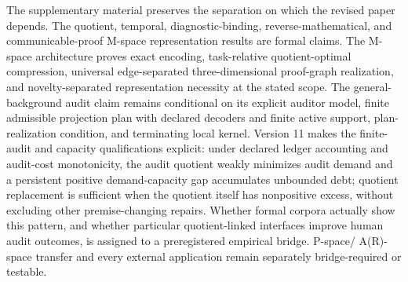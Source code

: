 \documentclass[11pt]{article}
\theoremstyle{plain}
\theoremstyle{definition}
\theoremstyle{remark}
\begin{document}
The supplementary material preserves the separation on which the revised paper
depends.  The quotient, temporal, diagnostic-binding, reverse-mathematical, and
communicable-proof M-space representation results are formal claims.  The
M-space architecture proves exact encoding, task-relative quotient-optimal
compression, universal edge-separated three-dimensional proof-graph
realization, and novelty-separated representation necessity at the stated
scope.  The general-background audit claim remains conditional on its explicit
auditor model, finite admissible projection plan with declared decoders and
finite active support, plan-realization condition, and terminating local
kernel.  Version 11 makes the finite-audit and capacity qualifications explicit:
under declared ledger accounting and audit-cost monotonicity, the audit quotient
weakly minimizes audit demand and a persistent positive demand-capacity gap
accumulates unbounded debt; quotient replacement is sufficient when the quotient
itself has nonpositive excess, without excluding other premise-changing repairs.  Whether formal corpora actually
show this pattern, and whether particular quotient-linked interfaces improve
human audit outcomes, is assigned to a preregistered empirical bridge.  P-space/
A(R)-space transfer and every external application remain separately
bridge-required or testable.
\end{document}
